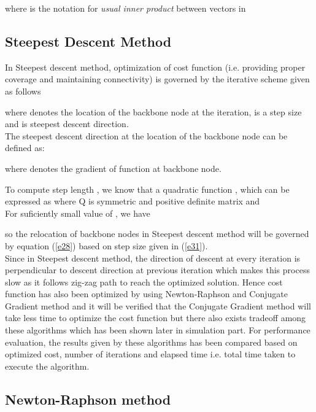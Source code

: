 \documentclass[11pt]{article}
\numberwithin{equation}{section}
\begin{document}
 
 where  is the notation for {\it usual inner product} between vectors in 





\subsection{Steepest Descent Method}
In Steepest descent method, optimization of cost function (i.e. providing proper coverage and maintaining connectivity) is governed by the iterative scheme given as follows

where    denotes the location of the backbone node  at the  iteration,   is a step size and   is steepest descent direction.\\

The steepest descent direction at the location of the  backbone node can be defined as:

where
 denotes the gradient of function   at  backbone node.



To compute step length , we know that a quadratic function , which can be expressed as
 where Q is symmetric and positive definite matrix and \\

   

For suficiently small value of , we have \newline
 

so the relocation of backbone nodes in Steepest descent method will be governed by equation (\ref{e28}) based on step size given in (\ref{e31}).\\

Since in Steepest descent method, the direction of descent at every iteration is perpendicular to descent direction at previous iteration which makes this process slow as it follows zig-zag path to reach the optimized solution. Hence cost function has also been optimized by using Newton-Raphson and Conjugate Gradient method and it will be verified that the Conjugate Gradient method will take less time to optimize the cost function but there also exists tradeoff among these algorithms which has been shown later in simulation part. For performance evaluation, the results given by these algorithms has been compared based on optimized cost, number of iterations and elapsed time i.e. total time taken to execute the algorithm.

\subsection{Newton-Raphson method }
\end{document}
